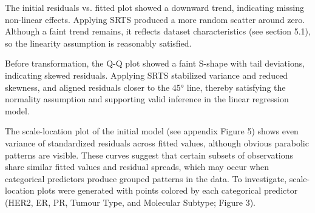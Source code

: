 \documentclass[letter]{article}
\begin{document}
The initial residuals vs. fitted plot showed a downward trend, indicating missing non-linear effects. Applying SRTS produced a more random scatter around zero.
Although a faint trend remains, it reflects dataset characteristics (see section 5.1), so the linearity assumption is reasonably satisfied.

Before transformation, the Q-Q plot showed a faint S-shape with tail deviations, indicating skewed residuals. Applying SRTS stabilized variance and reduced skewness, 
and aligned residuals closer to the 45° line, thereby satisfying the normality assumption and supporting valid inference in the linear regression model.

The scale-location plot of the initial model (see appendix Figure 5) shows even variance of standardized residuals across fitted values, although obvious parabolic patterns are visible. These curves suggest that
certain subsets of observations share similar fitted values and residual spreads, which may occur when categorical predictors produce grouped patterns in the data. To investigate, scale-location plots were 
generated with points colored by each categorical predictor (HER2, ER, PR, Tumour Type, and Molecular Subtype; Figure 3). 
\end{document}
